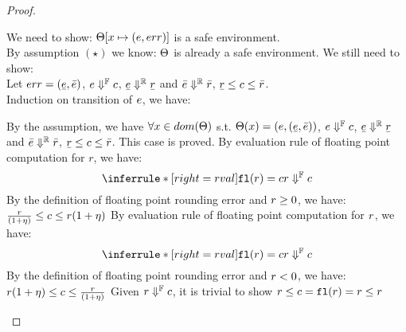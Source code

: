 \documentclass[a4paper,11pt]{article}
\begin{document}
\begin{proof}
\begin{itemize}
	\caseL{\[
	\inferrule*[right = asg]
	{
		\trsenv, \expr \trsto (\expr, \err )
	}
	{
		\trsenv, \varx = \expr
		\trsto
		\trsenv[\varx \mapsto (\expr, \err )]
	}
	\]}
	We need to show: $\Theta[x \mapsto (e, err )]$ is a safe environment.\\
	By assumption $(\star)$ we know: $\Theta$ is already a safe environment. We still need to show:\\
	Let $\err = (\ubar{\expr}, \bar{\expr})$, 
	$e \Downarrow^{\mathbb{F}} c $, $\ubar{\expr} \rbigstep \ubar{r}$ and $\bar{e} \Downarrow^{\mathbb{R}} \bar{r}$, 
	$\ubar{r} \leq c \leq \bar{r}$.\\
	Induction on transition of $e$, we have:
	\begin{itemize}
%
	\subcaseL{
	\[\inferrule*[right = var]
		{
			\trsenv(\varx) 
			= (\expr, ( \ubar{\expr}, \bar{\expr} ))
		}
		{
			\trsenv, \varx
			\trsto
			(\expr, ( \ubar{\expr}, \bar{\expr} ))
		}\]
		}
	By the assumption, we have $\forall x \in dom(\Theta)$ s.t. $\trsenv(x) = (\expr, (\ubar{\expr}, \bar{\expr}))$, $e \Downarrow^{\mathbb{F}} c $, $\ubar{\expr} \rbigstep \ubar{r}$ and $\bar{e} \Downarrow^{\mathbb{R}} \bar{r}$, 
	$\ubar{r} \leq c \leq \bar{r}$.
	This case is proved.
	By evaluation rule of floating point computation for $r$, we have:
	\[
	\inferrule*[right = rval]
		{
			\floaten(\rval ) = \fval
		}
		{
			\rval
			\fbigstep
			\fval
		}
	\]
	By the definition of floating point rounding error and $r \geq 0$, we have:
	$\frac{r}{(1 + \eta)}
	\leq c \leq
	r(1 + \eta)$
	\subcaseL{\[
	\inferrule*[right = val-neg]
		{
			\fval = \floaten(\rval)
			\and
			\rval < 0
		}
		{
			\trsenv, \rval
			\trsto
			\big(\rval, \rval(1 + \eta), \frac{\rval}{(1 + \eta)} \big)
		}
	\]}
	By evaluation rule of floating point computation for $r$, we have:
	\[
	\inferrule*[right = rval]
		{
			\floaten(\rval ) = \fval
		}
		{
			\rval
			\fbigstep
			\fval
		}
	\]
	By the definition of floating point rounding error and $r < 0$, we have:
	$r(1 + \eta)
	\leq c \leq
	\frac{r}{(1 + \eta)}$
	\subcaseL{
	\[
	\inferrule*[right = val-eq]
		{
			\rval = \floaten(\rval)
		}
		{
			\trsenv, \rval
			\trsto
			(\rval, \rval, \rval )
		}
	\]
	}
	Given $r \Downarrow^{\mathbb{F}} c$, it is trivial to show $r \leq c = \mathtt{fl}(r) = r \leq r$
\end{itemize}
\end{itemize}
\end{proof}
\end{document}
